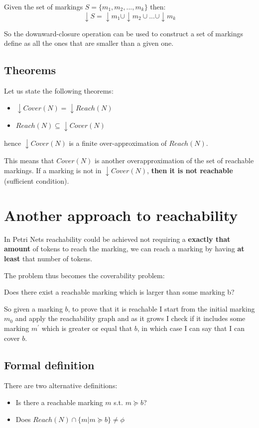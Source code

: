 Given the set of markings $S = \{m_{1}, m_{2}, ..., m_{k}\}$ then:
\begin{equation*}
    \downarrow S = \downarrow m_{1} \cup \downarrow m_{2} \cup ... \cup \downarrow m_{k}
\end{equation*}

So the downward-closure operation can be used to construct a set of markings define as all the ones that are smaller than a given one.

\subsection{Theorems}
Let us state the following theorems:
\begin{itemize}
    \item $\downarrow Cover(N) = \downarrow Reach(N)$
    \item $Reach(N) \subseteq \downarrow Cover(N)$
\end{itemize}
hence $\downarrow Cover(N)$ is a finite over-approximation of $Reach(N)$.\par
This means that $Cover(N)$ is another overapproximation of the set of reachable markings. If a marking is not in $\downarrow Cover(N)$, \textbf{then it is not reachable} (sufficient condition).

\section{Another approach to reachability}
In Petri Nets reachability could be achieved not requiring a \textbf{exactly that amount} of tokens to reach the marking, we can reach a marking by having \textbf{at least} that number of tokens. \par
The problem thus becomes the coverability problem:
\begin{center}
    Does there exist a reachable marking which is larger than some marking b?
\end{center}

So given a marking $b$, to prove that it is reachable I start from the initial marking $m_{0}$ and apply the reachability graph and as it grows I check if it includes some marking $m^{'}$ which is greater or equal that $b$, in which case I can say that I can cover $b$.

\subsection{Formal definition}
There are two alternative definitions:
\begin{itemize}
    \item Is there a reachable marking $m$ s.t. $m \succeq b$?
    \item Does $Reach(N) \cap \{m | m \succeq b\} \neq \phi$ 
\end{itemize}


